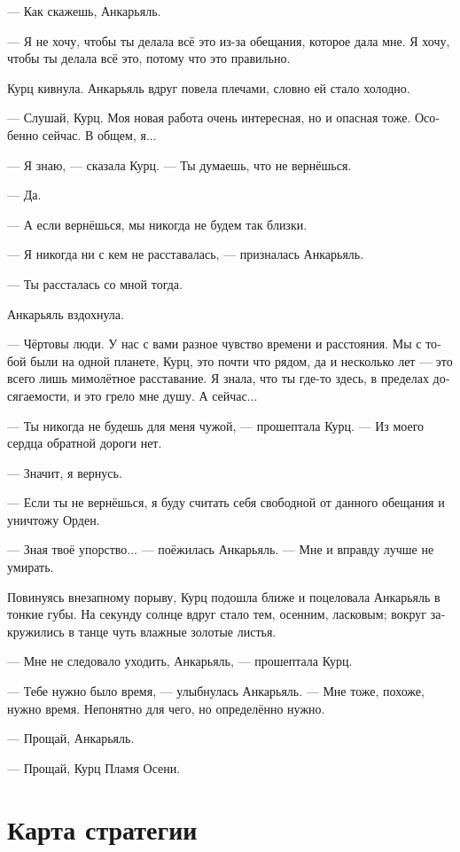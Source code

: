 \documentclass[a4paper,10pt,fleqn]{book}\usepackage{polyglossia}\setdefaultlanguage[babelshorthands=true]{russian}\setotherlanguage{english}\defaultfontfeatures{Ligatures=TeX,Mapping=tex-text}\usepackage{xcolor}\newcommand{\ml}[3]{#2}
\begin{document}
--- Как скажешь, Анкарьяль.

--- Я не хочу, чтобы ты делала всё это из-за обещания, которое дала мне.
Я хочу, чтобы ты делала всё это, потому что это правильно.

Курц кивнула.
Анкарьяль вдруг повела плечами, словно ей стало холодно.

--- Слушай, Курц.
Моя новая работа очень интересная, но и опасная тоже.
Особенно сейчас.
В общем, я...

--- Я знаю, --- сказала Курц.
--- Ты думаешь, что не вернёшься.

--- Да.

\ml{$0$}
{--- А если вернёшься, мы никогда не будем так близки.}
{``And even if you come back, we'll never be as close as we are now.''}

--- Я никогда ни с кем не расставалась, --- призналась Анкарьяль.

--- Ты рассталась со мной тогда.

Анкарьяль вздохнула.

--- Чёртовы люди.
У нас с вами разное чувство времени и расстояния.
Мы с тобой были на одной планете, Курц, это почти что рядом, да и несколько лет --- это всего лишь мимолётное расставание.
Я знала, что ты где-то здесь, в пределах досягаемости, и это грело мне душу.
А сейчас...

--- Ты никогда не будешь для меня чужой, --- прошептала Курц.
\ml{$0$}
{--- Из моего сердца обратной дороги нет.}
{``There's no way back from my heart.''}

--- Значит, я вернусь.

--- Если ты не вернёшься, я буду считать себя свободной от данного обещания и уничтожу Орден.

--- Зная твоё упорство... --- поёжилась Анкарьяль.
--- Мне и вправду лучше не умирать.

Повинуясь внезапному порыву, Курц подошла ближе и поцеловала Анкарьяль в тонкие губы.
На секунду солнце вдруг стало тем, осенним, ласковым;
вокруг закружились в танце чуть влажные золотые листья.

--- Мне не следовало уходить, Анкарьяль, --- прошептала Курц.

--- Тебе нужно было время, --- улыбнулась Анкарьяль.
--- Мне тоже, похоже, нужно время.
Непонятно для чего, но определённо нужно.

--- Прощай, Анкарьяль.

--- Прощай, Курц Пламя Осени.

\section{Карта стратегии}
\end{document}
